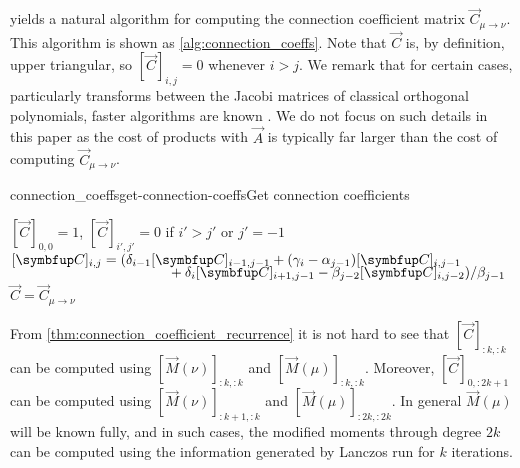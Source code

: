      yields a natural algorithm for computing the connection coefficient matrix \( \vec{C}_{\mu\to\nu} \).
    This algorithm is shown as \cref{alg:connection_coeffs}.
    Note that \( \vec{C} \) is, by definition, upper triangular, so \( [\vec{C}]_{i,j}  = 0 \) whenever \( i > j \).
    We remark that for certain cases, particularly transforms between the Jacobi matrices of classical orthogonal polynomials, faster algorithms are known \cite{townsend_webb_olver_17}.
    We do not focus on such details in this paper as the cost of products with \( \vec{A} \) is typically far larger than the cost of computing \( \vec{C}_{\mu\to\nu} \).

    \begin{labelalgorithm}[H]{connection_coeffs}{get-connection-coeffs}{Get connection coefficients}
    \begin{algorithmic}[1]
        \State \( [\vec{C}]_{0,0} = 1 \), \( [\vec{C}]_{i',j'} = 0 \) if \( i' > j' \) or \( j' = -1 \)
        \State 
        \(
        \begin{aligned}%
            \relax[\vec{C}]_{i,j} = (&\delta_{i-1} [\vec{C}]_{i-1,j-1} + (\gamma_i - \alpha_{j-1}) [\vec{C}]_{i,j-1} 
            \\[-.6em]&\hspace{3em}+ \delta_i[\vec{C}]_{i+1,j-1} 
            - \beta_{j-2} [ \vec{C}]_{i,j-2}) / \beta_{j-1} 
        \end{aligned}\)
        \EndFor
        \EndFor
        \State \Return \( \vec{C} = \vec{C}_{\mu\to\nu} \)
    \EndProcedure
    \end{algorithmic}
    \end{labelalgorithm}

    \begin{remark}
        From \cref{thm:connection_coefficient_recurrence} it is not hard to see that \( [\vec{C}]_{:k,:k} \) can be computed using \( [\vec{M}(\nu)]_{:k,:k} \) and \( [\vec{M}(\mu)]_{:k,:k} \). 
        Moreover, \( [\vec{C}]_{0,:2k+1} \) can be computed using \( [\vec{M}(\nu)]_{:k+1,:k} \) and \( [\vec{M}(\mu)]_{:2k,:2k} \). 
        In general \( \vec{M}(\mu) \) will be known fully, and in such cases, the modified moments through degree \( 2k \) can be computed using the information generated by Lanczos run for \( k \) iterations.
    \end{remark}

